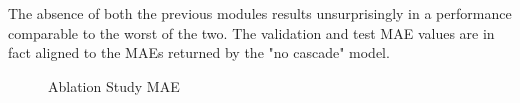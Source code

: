 The absence of both the previous modules results unsurprisingly in a performance comparable 
to the worst of the two. The validation and test MAE values are in fact aligned to the MAEs 
returned by the "no cascade" model.

\begin{figure}
  \centering
  \hspace{0mm}
  \caption{Ablation Study MAE}
\end{figure}